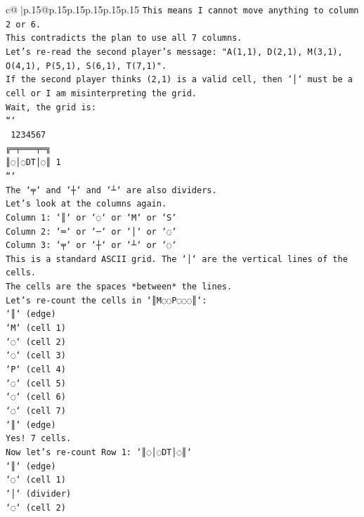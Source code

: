 \documentclass{article}
\begin{document}
{\begin{supertabular}{c@{$\;$}|p{.15\linewidth}@{}p{.15\linewidth}p{.15\linewidth}p{.15\linewidth}p{.15\linewidth}p{.15\linewidth}}
{{{\texttt{This means I cannot move anything to column 2 or 6.} \\
\texttt{This contradicts the plan to use all 7 columns.} \\
\texttt{Let's re{-}read the second player's message: "A(1,1), D(2,1), M(3,1), O(4,1), P(5,1), S(6,1), T(7,1)".} \\
\texttt{If the second player thinks (2,1) is a valid cell, then `│` must be a cell or I am misinterpreting the grid.} \\
\texttt{Wait, the grid is:} \\
\texttt{```} \\
\texttt{ 1234567} \\
\texttt{╔═╤═══╤═╗} \\
\texttt{║◌│◌DT│◌║ 1} \\
\texttt{```} \\
\texttt{The `╤` and `┼` and `┴` are also dividers.} \\
\texttt{Let's look at the columns again.} \\
\texttt{Column 1: `║` or `◌` or `M` or `S`} \\
\texttt{Column 2: `═` or `─` or `│` or `◌`} \\
\texttt{Column 3: `╤` or `┼` or `┴` or `◌`} \\
\texttt{This is a standard ASCII grid. The `│` are the vertical lines of the cells.} \\
\texttt{The cells are the spaces *between* the lines.} \\
\texttt{Let's re{-}count the cells in `║M◌◌P◌◌◌║`:} \\
\texttt{`║` (edge)} \\
\texttt{`M` (cell 1)} \\
\texttt{`◌` (cell 2)} \\
\texttt{`◌` (cell 3)} \\
\texttt{`P` (cell 4)} \\
\texttt{`◌` (cell 5)} \\
\texttt{`◌` (cell 6)} \\
\texttt{`◌` (cell 7)} \\
\texttt{`║` (edge)} \\
\texttt{Yes! 7 cells.} \\
\texttt{Now let's re{-}count Row 1: `║◌│◌DT│◌║`} \\
\texttt{`║` (edge)} \\
\texttt{`◌` (cell 1)} \\
\texttt{`│` (divider)} \\
\texttt{`◌` (cell 2)} \\
}}}
\end{supertabular}}
\end{document}
